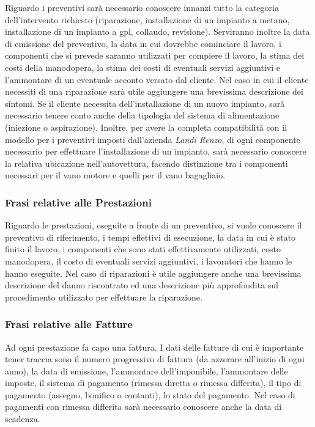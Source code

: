 			Riguardo i preventivi sarà necessario conoscere innanzi tutto la categoria dell'intervento richiesto (riparazione, installazione di un impianto a metano, installazione di un impianto a gpl, collaudo, revisione). Serviranno inoltre la data di emissione del preventivo, la data in cui dovrebbe cominciare il lavoro, i componenti che si prevede saranno utilizzati per compiere il lavoro, la stima dei costi della manodopera, la stima dei costi di eventuali servizi aggiuntivi e l'ammontare di un eventuale acconto versato dal cliente.
			Nel caso in cui il cliente necessiti di una riparazione sarà utile aggiungere una brevissima descrizione dei sintomi.
			Se il cliente necessita dell’installazione di un nuovo impianto, sarà necessario tenere conto anche della tipologia del sistema di alimentazione (iniezione o aspirazione). Inoltre, per avere la completa compatibilità con il modello per i preventivi imposti dall'azienda \emph{Landi Renzo}, di ogni componente necessario per effettuare l'installazione di un impianto, sarà necessario conoscere la relativa ubicazione nell'autovettura, facendo distinzione tra i componenti necessari per il vano motore e quelli per il vano bagagliaio.
			
		\subsubsection{Frasi relative alle Prestazioni}
		
			Riguardo le prestazioni, eseguite a fronte di un preventivo, si vuole conoscere il preventivo di riferimento, i tempi effettivi di esecuzione, la data in cui è stato finito il lavoro, i componenti che sono stati effettivamente utilizzati, costo manodopera, il costo di eventuali servizi aggiuntivi, i lavoratori che hanno le hanno eseguite.
			Nel caso di riparazioni è utile aggiungere anche una brevissima descrizione del danno riscontrato ed una descrizione più approfondita sul procedimento utilizzato per effettuare la riparazione.
			
		\subsubsection{Frasi relative alle Fatture}
		
			Ad ogni prestazione fa capo una fattura. I dati delle fatture di cui è importante tener traccia sono il numero progressivo di fattura (da azzerare all'inizio di ogni anno), la data di emissione, l'ammontare dell'imponibile, l'ammontare delle imposte, il sistema di pagamento (rimessa diretta o rimessa differita), il tipo di pagamento (assegno, bonifico o contanti), lo stato del pagamento. Nel caso di pagamenti con rimessa differita sarà necessario conoscere anche la data di scadenza.
		
